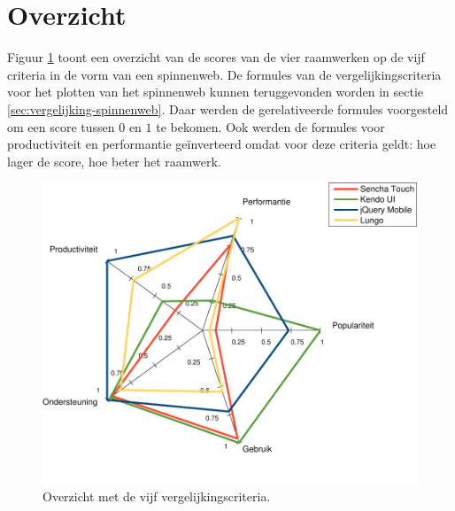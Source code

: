 \section{Overzicht}
\label{sec:evaluatie-spinnenweb}

Figuur \ref{fig:spinnenweb-final} toont een overzicht van de scores van de vier raamwerken op de vijf criteria in de vorm van een spinnenweb.
De formules van de vergelijkingscriteria voor het plotten van het spinnenweb kunnen teruggevonden worden in sectie \ref{sec:vergelijking-spinnenweb}.
Daar werden de gerelativeerde formules voorgesteld om een score tussen $0$ en $1$ te bekomen.
Ook werden de formules voor productiviteit en performantie geïnverteerd omdat voor deze criteria geldt:  hoe lager de score, hoe beter het raamwerk.

\begin{figure}
  \centering
  \includegraphics[width=\textwidth]{figuren/spidergraph-final-nl.pdf}
  \caption{Overzicht met de vijf vergelijkingscriteria.}
  \label{fig:spinnenweb-final}
\end{figure}



     

